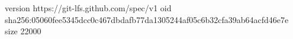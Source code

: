 version https://git-lfs.github.com/spec/v1
oid sha256:05060fee5345dcc0c467dbdafb77da1305244af05c6b32cfa39ab64acfd46e7e
size 22000
